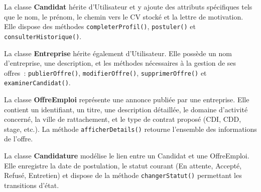 \documentclass[12pt,a4paper]{report}
\begin{document}
La classe \textbf{Candidat} hérite d'Utilisateur et y ajoute des attributs spécifiques tels que le nom, le prénom, le chemin vers le CV stocké et la lettre de motivation. Elle dispose des méthodes \texttt{completerProfil()}, \texttt{postuler()} et \texttt{consulterHistorique()}.

La classe \textbf{Entreprise} hérite également d'Utilisateur. Elle possède un nom d'entreprise, une description, et les méthodes nécessaires à la gestion de ses offres~: \texttt{publierOffre()}, \texttt{modifierOffre()}, \texttt{supprimerOffre()} et \texttt{examinerCandidat()}.

La classe \textbf{OffreEmploi} représente une annonce publiée par une entreprise. Elle contient un identifiant, un titre, une description détaillée, le domaine d'activité concerné, la ville de rattachement, et le type de contrat proposé (CDI, CDD, stage, etc.). La méthode \texttt{afficherDetails()} retourne l'ensemble des informations de l'offre.

La classe \textbf{Candidature} modélise le lien entre un Candidat et une OffreEmploi. Elle enregistre la date de postulation, le statut courant (En attente, Accepté, Refusé, Entretien) et dispose de la méthode \texttt{changerStatut()} permettant les transitions d'état.
\end{document}
